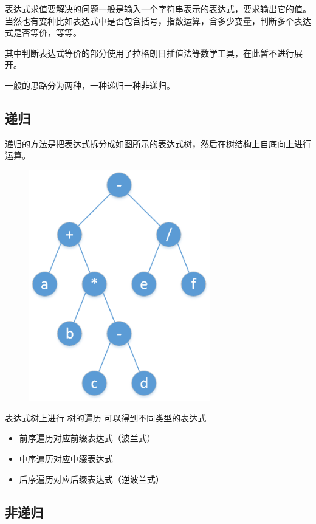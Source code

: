
表达式求值要解决的问题一般是输入一个字符串表示的表达式，要求输出它的值。当然也有变种比如表达式中是否包含括号，指数运算，含多少变量，判断多个表达式是否等价，等等。

其中判断表达式等价的部分使用了拉格朗日插值法等数学工具，在此暂不进行展开。

一般的思路分为两种，一种递归一种非递归。

\subsection{递归}

递归的方法是把表达式拆分成如图所示的表达式树，然后在树结构上自底向上进行运算。

\begin{figure}[htbp]
\centering
\includegraphics[width=0.7\textwidth]{docs/basic/images/bet.png} 

\end{figure}

表达式树上进行  树的遍历  可以得到不同类型的表达式

\begin{itemize}
\item 前序遍历对应前缀表达式（波兰式）
\item 中序遍历对应中缀表达式
\item 后序遍历对应后缀表达式（逆波兰式）
\end{itemize}

\subsection{非递归}

